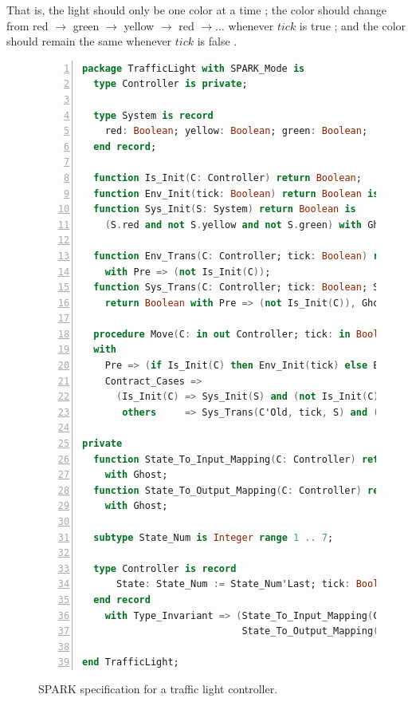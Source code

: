 \documentclass[runningheads]{llncs}
\begin{document}
\noindent That is, the light should only be one color at a time ; 
the color should change from red $\rightarrow$ green $\rightarrow$ yellow $\rightarrow$ red $\rightarrow \ldots$ whenever $tick$ is true ; 
and the color should remain the same whenever $tick$ is false .

\renewcommand{\floatpagefraction}{.8}%

\begin{figure}
\begin{lstlisting}[language={Ada}, basicstyle=\scriptsize, numbers=left]
package TrafficLight with SPARK_Mode is
  type Controller is private;
  
  type System is record
    red: Boolean; yellow: Boolean; green: Boolean;
  end record;
  
  function Is_Init(C: Controller) return Boolean;
  function Env_Init(tick: Boolean) return Boolean is (True);
  function Sys_Init(S: System) return Boolean is 
    (S.red and not S.yellow and not S.green) with Ghost;
    
  function Env_Trans(C: Controller; tick: Boolean) return Boolean
    with Pre => (not Is_Init(C));
  function Sys_Trans(C: Controller; tick: Boolean; S: System) 
    return Boolean with Pre => (not Is_Init(C)), Ghost;
    
  procedure Move(C: in out Controller; tick: in Boolean; S: out System)
  with 
    Pre => (if Is_Init(C) then Env_Init(tick) else Env_Trans(C, tick)),
    Contract_Cases =>
      (Is_Init(C) => Sys_Init(S) and (not Is_Init(C)),
       others     => Sys_Trans(C'Old, tick, S) and (not Is_Init(C)));

private
  function State_To_Input_Mapping(C: Controller) return Boolean
    with Ghost;
  function State_To_Output_Mapping(C: Controller) return Boolean
    with Ghost;
  
  subtype State_Num is Integer range 1 .. 7;
  
  type Controller is record
      State: State_Num := State_Num'Last; tick: Boolean; S: System;
  end record
    with Type_Invariant => (State_To_Input_Mapping(Controller) and 
                            State_To_Output_Mapping(Controller));
      
end TrafficLight;
\end{lstlisting}
  \caption{SPARK specification for a traffic light controller.}
  \label{fig:trafficLightSpec}
\end{figure}
\end{document}
